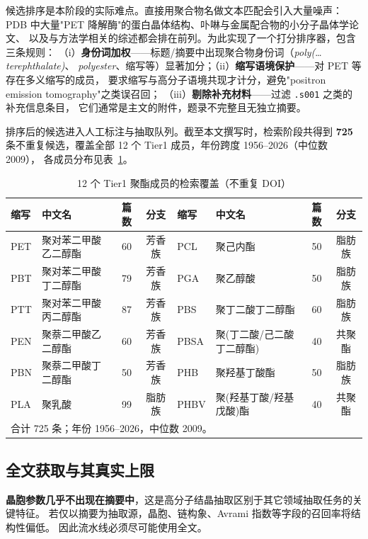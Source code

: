 \documentclass[11pt,a4paper]{ctexart}
\begin{document}
候选排序是本阶段的实际难点。直接用聚合物名做文本匹配会引入大量噪声：
PDB 中大量"PET 降解酶"的蛋白晶体结构、卟啉与金属配合物的小分子晶体学论文、
以及与方法学相关的综述都会排在前列。为此实现了一个打分排序器，包含三条规则：
（i）\textbf{身份词加权}——标题/摘要中出现聚合物身份词（\textit{poly(}\ldots\textit{terephthalate)}、
\textit{polyester}、缩写等）显著加分；（ii）\textbf{缩写语境保护}——对 PET 等存在多义缩写的成员，
要求缩写与高分子语境共现才计分，避免"positron emission tomography"之类误召回；
（iii）\textbf{剔除补充材料}——过滤 \texttt{.s001} 之类的补充信息条目，
它们通常是主文的附件，题录不完整且无独立摘要。

排序后的候选进入人工标注与抽取队列。截至本文撰写时，检索阶段共得到
\textbf{725} 条不重复候选，覆盖全部 12 个 Tier1 成员，年份跨度 1956--2026（中位数 2009），
各成员分布见表~\ref{tab:members}。

\begin{table}[htbp]
\centering
\caption{12 个 Tier1 聚酯成员的检索覆盖（不重复 DOI）}
\label{tab:members}
\begin{tabularx}{\textwidth}{l l c c l l c c}
\toprule
缩写 & 中文名 & 篇数 & 分支 & 缩写 & 中文名 & 篇数 & 分支\\
\midrule
PET & 聚对苯二甲酸乙二醇酯 & 60 & 芳香族 & PCL & 聚己内酯 & 50 & 脂肪族\\
PBT & 聚对苯二甲酸丁二醇酯 & 79 & 芳香族 & PGA & 聚乙醇酸 & 50 & 脂肪族\\
PTT & 聚对苯二甲酸丙二醇酯 & 87 & 芳香族 & PBS & 聚丁二酸丁二醇酯 & 60 & 脂肪族\\
PEN & 聚萘二甲酸乙二醇酯 & 60 & 芳香族 & PBSA & 聚(丁二酸/己二酸丁二醇酯) & 40 & 共聚酯\\
PBN & 聚萘二甲酸丁二醇酯 & 50 & 芳香族 & PHB & 聚羟基丁酸酯 & 50 & 脂肪族\\
PLA & 聚乳酸 & 99 & 脂肪族 & PHBV & 聚(羟基丁酸/羟基戊酸)酯 & 40 & 共聚酯\\
\midrule
\multicolumn{8}{l}{\footnotesize 合计 725 条；年份 1956--2026，中位数 2009。}\\
\bottomrule
\end{tabularx}
\end{table}

\subsection{全文获取与其真实上限}\label{sec:oa}

\textbf{晶胞参数几乎不出现在摘要中}，这是高分子结晶抽取区别于其它领域抽取任务的关键特征。
若仅以摘要为抽取源，晶胞、链构象、Avrami 指数等字段的召回率将结构性偏低。
因此流水线必须尽可能使用全文。
\end{document}
